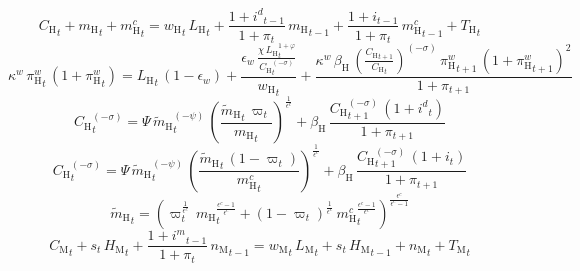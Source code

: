 \begin{dmath}
{C_\mathrm{H}}_{t}+{m_\mathrm{H}}_{t}+{m^c_\mathrm{H}}_{t}={w_\mathrm{H}}_{t}\, {L_\mathrm{H}}_{t}+\frac{1+{i^d}_{t-1}}{1+{\pi}_{t}}\, {m_\mathrm{H}}_{t-1}+\frac{1+{i}_{t-1}}{1+{\pi}_{t}}\, {m^c_\mathrm{H}}_{t-1}+{T_\mathrm{H}}_{t}
\end{dmath}
\begin{dmath}
{\kappa^w}\, {\pi^w_\mathrm{H}}_{t}\, \left(1+{\pi^w_\mathrm{H}}_{t}\right)={L_\mathrm{H}}_{t}\, \left(1-{\epsilon_w}\right)+\frac{{\epsilon_w}\, \frac{{\chi}\, {L_\mathrm{H}}_{t}^{1+{\varphi}}}{{C_\mathrm{H}}_{t}^{\left(-{\sigma}\right)}}}{{w_\mathrm{H}}_{t}}+\frac{{\kappa^w}\, {\beta_\mathrm{H}}\, \left(\frac{{C_\mathrm{H}}_{t+1}}{{C_\mathrm{H}}_{t}}\right)^{\left(-{\sigma}\right)}\, {\pi^w_\mathrm{H}}_{t+1}\, \left(1+{\pi^w_\mathrm{H}}_{t+1}\right)^{2}}{1+{\pi}_{t+1}}
\end{dmath}
\begin{dmath}
{C_\mathrm{H}}_{t}^{\left(-{\sigma}\right)}={\Psi}\, {\widetilde{m}_\mathrm{H}}_{t}^{\left(-{\psi}\right)}\, \left(\frac{{\widetilde{m}_\mathrm{H}}_{t}\, {\varpi}_{t}}{{m_\mathrm{H}}_{t}}\right)^{\frac{1}{{\epsilon^c}}}+{\beta_\mathrm{H}}\, \frac{{C_\mathrm{H}}_{t+1}^{\left(-{\sigma}\right)}\, \left(1+{i^d}_{t}\right)}{1+{\pi}_{t+1}}
\end{dmath}
\begin{dmath}
{C_\mathrm{H}}_{t}^{\left(-{\sigma}\right)}={\Psi}\, {\widetilde{m}_\mathrm{H}}_{t}^{\left(-{\psi}\right)}\, \left(\frac{{\widetilde{m}_\mathrm{H}}_{t}\, \left(1-{\varpi}_{t}\right)}{{m^c_\mathrm{H}}_{t}}\right)^{\frac{1}{{\epsilon^c}}}+{\beta_\mathrm{H}}\, \frac{{C_\mathrm{H}}_{t+1}^{\left(-{\sigma}\right)}\, \left(1+{i}_{t}\right)}{1+{\pi}_{t+1}}
\end{dmath}
\begin{dmath}
{\widetilde{m}_\mathrm{H}}_{t}=\left({\varpi}_{t}^{\frac{1}{{\epsilon^c}}}\, {m_\mathrm{H}}_{t}^{\frac{{\epsilon^c}-1}{{\epsilon^c}}}+\left(1-{\varpi}_{t}\right)^{\frac{1}{{\epsilon^c}}}\, {m^c_\mathrm{H}}_{t}^{\frac{{\epsilon^c}-1}{{\epsilon^c}}}\right)^{\frac{{\epsilon^c}}{{\epsilon^c}-1}}
\end{dmath}
\begin{dmath}
{C_\mathrm{M}}_{t}+{s}_{t}\, {H_\mathrm{M}}_{t}+\frac{1+{i^m}_{t-1}}{1+{\pi}_{t}}\, {n_\mathrm{M}}_{t-1}={w_\mathrm{M}}_{t}\, {L_\mathrm{M}}_{t}+{s}_{t}\, {H_\mathrm{M}}_{t-1}+{n_\mathrm{M}}_{t}+{T_\mathrm{M}}_{t}
\end{dmath}
